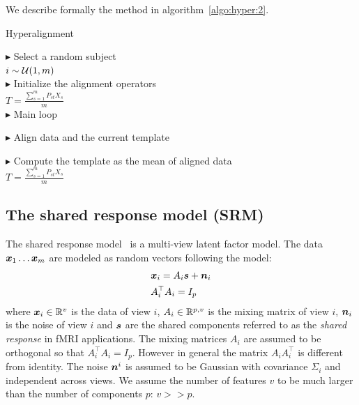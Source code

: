 We describe formally
the method in algorithm~\ref{algo:hyper:2}.

\begin{algorithm}[H]
  \SetAlgoLined
  \caption{Hyperalignment}
  \label{algo:shicaj}
  $\blacktriangleright$ Select a random subject \\
  $i \sim \mathcal{U}(1, m)$ \\
  $\blacktriangleright$ Initialize the alignment operators \\
  $T = \frac{\sum_{s=1}^m P_{st} X_s}{m}$ \\

  $\blacktriangleright$ Main loop \\
  {
    $\blacktriangleright$ Align data and the current template \\

    $\blacktriangleright$ Compute the template as the mean of aligned data \\
    $T = \frac{\sum_{s=1}^m P_{st} X_s}{m}$ \\
    }
\end{algorithm}



\subsection{The shared response model (SRM)}
The shared response model~\cite{chen2015reduced} is a multi-view latent factor
model. The data $\boldsymbol{x}_1 \dots \boldsymbol{x}_m$ are modeled as random vectors following the model:
\begin{align}
 &\boldsymbol{x}_i = A_i \boldsymbol{s} + \boldsymbol{n}_i \\
  &A_i^{\top}A_i = I_p
  \label{eq:model:srm}
\end{align}
where $\boldsymbol{x}_i \in \mathbb{R}^v$ is the data of view $i$, $A_i \in \mathbb{R}^{p, v}$ is the
mixing matrix of view $i$, $\boldsymbol{n}_i$ is the noise of view $i$ and $\boldsymbol{s}$ are the
shared components referred to as the \emph{shared response} in fMRI applications.
The mixing matrices
$A_i$ are assumed to be orthogonal so that $A_i^{\top}A_i = I_p$. However in
general the matrix $A_i A_i^{\top}$ is different from identity. The noise
$\boldsymbol{n}^i$ is assumed to be Gaussian with covariance $\Sigma_i$ and independent
across views. We assume the number of features $v$ to be much larger than the
number of components $p$: $v >> p$.

